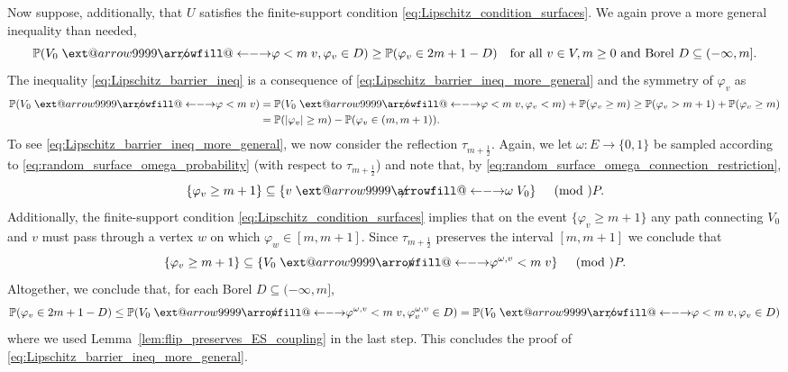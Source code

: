 \documentclass[english]{article}
\makeatletter
\renewcommand{\P}{\mathbb{P}}
\newcommand\xleftrightarrow[2][]{%
  \ext@arrow 9999{\longleftrightarrowfill@}{#1}{#2}}
\newcommand\longleftrightarrowfill@{%
  \arrowfill@\leftarrow\relbar\rightarrow}
\theoremstyle{plain}
\theoremstyle{plain}
\makeatother
\begin{document}
Now suppose, additionally, that $U$ satisfies the finite-support condition
\eqref{eq:Lipschitz_condition_surfaces}. We again prove a more general inequality than needed,
\begin{equation}\label{eq:Lipschitz_barrier_ineq_more_general}
  \mathbb{P}(V_0\centernot{\xleftrightarrow{\varphi< m}} v, \varphi_v\in D)\ge
\mathbb{P}(\varphi_v\in 2m+1-D)\quad \text{for all $v\in V,
  m\ge 0$ and Borel $D\subseteq(-\infty, m]$}.
\end{equation}
The inequality \eqref{eq:Lipschitz_barrier_ineq} is a consequence of \eqref{eq:Lipschitz_barrier_ineq_more_general} and the symmetry of $\varphi_v$ as
\begin{equation*}
\begin{split}
  \mathbb{P}(V_0\centernot{\xleftrightarrow{\varphi< m}} v) &= \mathbb{P}(V_0\centernot{\xleftrightarrow{\varphi< m}} v, \varphi_v<m) +
  \mathbb{P}(\varphi_v\ge m) \ge \mathbb{P}(\varphi_v>m+1)+\mathbb{P}(\varphi_v\ge m)\\
  &= \mathbb{P}(|\varphi_v|\ge m) - \P(\varphi_v\in(m,m+1)).
\end{split}
\end{equation*}
To see \eqref{eq:Lipschitz_barrier_ineq_more_general}, we now consider the reflection $\tau_{m+\frac{1}{2}}$. Again, we let $\omega:E\to\{0,1\}$ be sampled
according to \eqref{eq:random_surface_omega_probability} (with respect to $\tau_{m+\frac{1}{2}}$) and note that, by
\eqref{eq:random_surface_omega_connection_restriction},
\begin{equation*}
  \{\varphi_v\ge m+1\}\subseteq\{v\centernot{\xleftrightarrow{\omega}}V_0\}\quad\pmod\P.
\end{equation*}
Additionally, the finite-support condition \eqref{eq:Lipschitz_condition_surfaces} implies that on the event $\{\varphi_v\ge m+1\}$ any path connecting $V_0$
and $v$ must pass through a vertex $w$ on which $\varphi_w\in [m,m+1]$. Since $\tau_{m+\frac{1}{2}}$ preserves the interval $[m, m+1]$ we conclude that
\begin{equation*}
  \{\varphi_v\ge m+1\}\subseteq\{V_0\centernot{\xleftrightarrow{\varphi^{\omega, v}< m}} v\}\quad\pmod\P.
\end{equation*}
Altogether, we conclude that, for each Borel $D\subseteq(-\infty,m]$,
\begin{equation*}
  \mathbb{P}(\varphi_v\in 2m+1-D) \le \mathbb{P}(V_0\centernot{\xleftrightarrow{\varphi^{\omega, v}< m}} v, \varphi^{\omega,v}_v\in D) =
  \mathbb{P}(V_0\centernot{\xleftrightarrow{\varphi< m}} v, \varphi_v\in D)
\end{equation*}
where we used Lemma~\ref{lem:flip_preserves_ES_coupling} in the last step. This concludes the proof of \eqref{eq:Lipschitz_barrier_ineq_more_general}.
\end{document}
